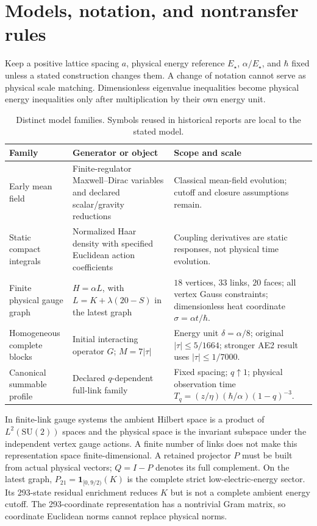\section{Models, notation, and nontransfer rules}
\label{sec:models}
Keep a positive lattice spacing $a$, physical energy reference $E_\star$, $\alpha/E_\star$, and $\hbar$ fixed unless a stated construction changes them. A change of notation cannot serve as physical scale matching. Dimensionless eigenvalue inequalities become physical energy inequalities only after multiplication by their own energy unit.

\begin{table}[htbp]\centering\small
\caption{Distinct model families. Symbols reused in historical reports are local to the stated model.}
\label{tab:models}
\begin{tabularx}{\textwidth}{@{}p{}X X@{}}\toprule
Family & Generator or object & Scope and scale \\\midrule
Early mean field & Finite-regulator Maxwell--Dirac variables and declared scalar/gravity reductions & Classical mean-field evolution; cutoff and closure assumptions remain. \\
Static compact integrals & Normalized Haar density with specified Euclidean action coefficients & Coupling derivatives are static responses, not physical time evolution. \\
Finite physical gauge graph & $H=\alpha L$, with $L=K+\lambda(20-S)$ in the latest graph & $18$ vertices, $33$ links, $20$ faces; all vertex Gauss constraints; dimensionless heat coordinate $\sigma=\alpha t/\hbar$. \\
Homogeneous complete blocks & Initial interacting operator $G$; $M=7|\tau|$ & Energy unit $\delta=\alpha/8$; original $|\tau|\le5/1664$; stronger AE2 result uses $|\tau|\le1/7000$. \\
Canonical summable profile & Declared $q$-dependent full-link family & Fixed spacing; $q\uparrow1$; physical observation time $T_q=(z/\eta)(\hbar/\alpha)(1-q)^{-3}$. \\
\bottomrule\end{tabularx}
\end{table}

In finite-link gauge systems the ambient Hilbert space is a product of $L^2(\mathrm{SU}(2))$ spaces and the physical space is the invariant subspace under the independent vertex gauge actions. A finite number of links does not make this representation space finite-dimensional. A retained projector $P$ must be built from actual physical vectors; $Q=I-P$ denotes its full complement. On the latest graph, $P_{21}=\mathbf{1}_{[0,9/2)}(K)$ is the complete strict low-electric-energy sector. Its 293-state residual enrichment reduces $K$ but is not a complete ambient energy cutoff. The 293-coordinate representation has a nontrivial Gram matrix, so coordinate Euclidean norms cannot replace physical norms.

